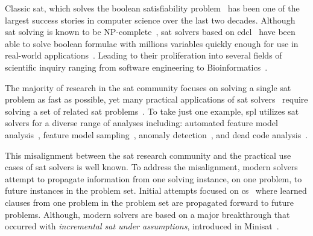 \label{section:motivation}
%
%
Classic \ac{sat}, which solves the boolean satisfiability
problem~\cite{10.5555/1550723} has been one of the largest success stories in
computer science over the last two decades. Although \ac{sat} solving is known
to be NP-complete~\cite{10.1145/800157.805047}, \ac{sat} solvers based on
\ac{cdcl}~\cite{Marques-Silva:1999:GSA:304491.304506,Silva:1997:GNS:244522.244560,10.5555/1867406.1867438}
have been able to solve boolean formulae with millions variables quickly enough
for use in real-world applications~\cite{10.5555/1557461}. Leading to their
proliferation into several fields of scientific inquiry ranging from software
engineering to
Bioinformatics~\cite{10.1007/11814948_16,10.1007/978-3-642-31612-8_12}.

The majority of research in the \ac{sat} community focuses on solving a single
\ac{sat} problem as fast as possible, yet many practical applications of
\ac{sat}
solvers~\cite{silva1997robust,10.1007/3-540-44798-9_4,10.1145/378239.379019,10.1145/1698759.1698762,Een_asingle-instance,een2003temporal,10.5555/1998496.1998520}
require solving a set of related \ac{sat}
problems~\cite{10.1007/3-540-44798-9_4, silva1997robust, een2003temporal}. To
take just one example, \ac{spl} utilizes \ac{sat} solvers for a diverse range of
analyses including: automated feature model
analysis~\cite{useBTRC05,GBT+19,TAK+:CSUR14}, feature model
sampling~\cite{MKR+:ICSE16,VAT+:SPLC18}, anomaly
detection~\cite{AKTS:FOSD16,KAT:TR16,MNS+:SPLC17}, and dead code
analysis~\cite{TLSS:EuroSys11}.

This misalignment between the \ac{sat} research community and the practical use
cases of \ac{sat} solvers is well known. To address the misalignment, modern
solvers attempt to propagate information from one solving instance, on one
problem, to future instances in the problem set. Initial attempts focused on
\ac{cs}~\cite{10.1007/3-540-44798-9_4,10.1145/378239.379019} where learned
clauses from one problem in the problem set are propagated forward to future
problems. Although, modern solvers are based on a major breakthrough that
occurred with \emph{incremental \ac{sat} under assumptions}, introduced in
Minisat~\cite{10.1007/978-3-540-24605-3_37}.

